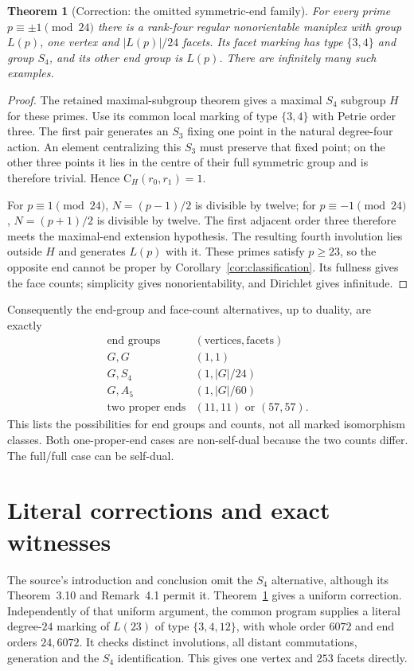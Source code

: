 \documentclass[11pt]{article}
\newtheorem{theorem}{Theorem}
\newcommand{\CG}{\mathrm C}
\begin{document}
\begin{theorem}[Correction: the omitted symmetric-end family]
\label{thm:S4}
For every prime $p\equiv\pm1\pmod{24}$ there is a rank-four regular
nonorientable maniplex with group $L(p)$, one vertex and $|L(p)|/24$
facets. Its facet marking has type $\{3,4\}$ and group $S_4$, and its
other end group is $L(p)$. There are infinitely many such examples.
\end{theorem}
\begin{proof}
The retained maximal-subgroup theorem gives a maximal $S_4$ subgroup
$H$ for these primes. Use its common local marking of type $\{3,4\}$
with Petrie order three. The first pair generates an $S_3$ fixing one
point in the natural degree-four action. An element centralizing this
$S_3$ must preserve that fixed point; on the other three points it lies
in the centre of their full symmetric group and is therefore trivial.
Hence $\CG_H(r_0,r_1)=1$.

For $p\equiv1\pmod{24}$, $N=(p-1)/2$ is divisible by twelve; for
$p\equiv-1\pmod{24}$, $N=(p+1)/2$ is divisible by twelve.
The first adjacent order three therefore meets the maximal-end
extension hypothesis. The resulting fourth involution lies outside $H$
and generates $L(p)$ with it. These primes satisfy $p\ge23$, so the
opposite end cannot be proper by Corollary~\ref{cor:classification}.
Its fullness gives the face counts; simplicity gives nonorientability,
and Dirichlet gives infinitude.
\end{proof}

Consequently the end-group and face-count alternatives, up to duality,
are exactly
\[
\begin{array}{c|c}
\text{end groups}&(\text{vertices},\text{facets})\\\hline
G,G&(1,1)\\
G,S_4&(1,|G|/24)\\
G,A_5&(1,|G|/60)\\
\text{two proper ends}&(11,11)\text{ or }(57,57).
\end{array}
\]
This lists the possibilities for end groups and counts, not all marked
isomorphism classes. Both one-proper-end cases are non-self-dual because
the two counts differ. The full/full case can be self-dual.

\section{Literal corrections and exact witnesses}
The source's introduction and conclusion omit the $S_4$ alternative,
although its Theorem~3.10 and Remark~4.1 permit it.
Theorem~\ref{thm:S4} gives a uniform correction. Independently of that
uniform argument, the common program supplies a literal degree-$24$
marking of $L(23)$ of type $\{3,4,12\}$, with whole order $6072$ and
end orders $24,6072$. It checks distinct involutions, all distant
commutations, generation and the $S_4$ identification. This gives one
vertex and $253$ facets directly.
\end{document}
